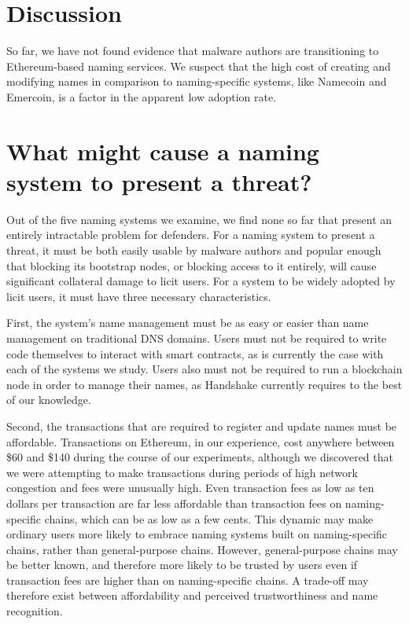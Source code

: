 \section{Discussion}
\label{sec:discussion}

So far, we have not found evidence that malware authors are 
transitioning to Ethereum-based naming services. We suspect that the high 
cost of creating and modifying names in comparison to naming-specific systems, 
like Namecoin and Emercoin, is a 
factor in the apparent low adoption rate. 


\section{What might cause a naming system to present a threat?}

Out of the five naming systems we examine, we find none so far that present an 
entirely intractable problem for defenders. For a naming system to present a  
threat, it must be both easily usable by malware authors and 
popular enough that blocking its bootstrap nodes, or blocking 
access to it entirely, will cause significant collateral damage to licit users.
For a system to be widely adopted by licit users, it must have three necessary 
characteristics. 

First, the system's name management must be as 
easy or easier than name management on traditional DNS domains. Users must not 
be required to write 
code themselves to interact with smart contracts, as is currently the case with 
each of the systems we 
study. Users also must not be required to run a blockchain node in order to 
manage their names, as 
Handshake currently requires to the best of our knowledge.

Second, the transactions that are required to register and update names must be 
affordable. 
Transactions on Ethereum, in our experience, cost anywhere between \$60 and 
\$140 during the course of 
our experiments, although we discovered that we were attempting to make 
transactions during periods of 
high network congestion and fees were unusually high. Even transaction fees as 
low as ten dollars per 
transaction are far less affordable than transaction fees on naming-specific 
chains, which can be as 
low as a few cents. This dynamic may make ordinary users more likely to embrace 
naming systems built 
on naming-specific chains, rather than general-purpose chains. However, 
general-purpose chains may be 
better known, and therefore more likely to be trusted by users even if 
transaction fees are higher 
than on naming-specific chains. A trade-off may therefore exist between 
affordability and perceived 
trustworthiness and name recognition. 


